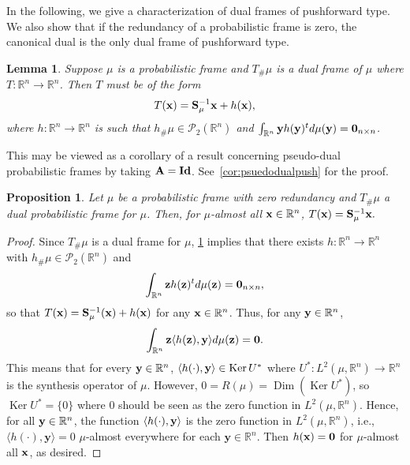 \documentclass{amsart}
\numberwithin{equation}{section}
\newcommand\R{{\mathbb R}}
\DeclareMathOperator{\kernel}{Ker}
\DeclareMathOperator{\Dim}{Dim}
\theoremstyle{plain}
\newtheorem{proposition}[theorem]{Proposition}
\newtheorem{lemma}[theorem]{Lemma}
\theoremstyle{remark}
\theoremstyle{definition}
\begin{document}
In the following, we give a characterization of dual frames of pushforward type. We also show that if the redundancy of a probabilistic frame is zero, the canonical dual is the only dual frame of pushforward type.

\begin{lemma}\label{dualChar}
    Suppose $\mu$ is a probabilistic frame and $T_\# \mu$ is a dual frame of $\mu$ where $T: \mathbb{R}^n \rightarrow \mathbb{R}^n$. Then $T$ must be of the form
    \begin{equation*}
        T({\bf x}) = {\bf S}_\mu^{-1}{\bf x} + h({\bf x}), 
    \end{equation*}
    where $h: \mathbb{R}^n \rightarrow \mathbb{R}^n$ is such that $h_\#\mu \in \mathcal{P}_2(\mathbb{R}^n)$ and $ \int_{\mathbb{R}^n } {\bf y} h({\bf y})^t d\mu({\bf y}) = {\bf 0}_{n \times n}$. 
\end{lemma}
This may be viewed as a corollary of a result concerning pseudo-dual probabilistic frames by taking ${\bf A =Id} $.  See~\cref{cor:psuedodualpush} for the proof.

\begin{proposition}\label{zeroRedundancy}
    Let $\mu$ be a probabilistic frame with zero redundancy and $T_\# \mu$ a dual probabilistic frame for $\mu$. Then, for $\mu$-almost all ${\bf x} \in \mathbb{R}^n$,  $T({\bf x}) = {\bf S}_\mu^{-1}{\bf x}.$
\end{proposition}
\begin{proof}
    Since $T_\# \mu$ is a dual frame for $\mu$, \cref{dualChar} implies that there exists $h: \mathbb{R}^n \rightarrow \mathbb{R}^n$ with $h_\#\mu \in \mathcal{P}_2(\mathbb{R}^n)$ and
    \begin{equation*}
        \int_{\mathbb{R}^n } {\bf z} h({\bf z})^t d\mu({\bf z}) = {\bf 0}_{n \times n},
    \end{equation*}
    so that $T({\bf x}) = {\bf S}_\mu^{-1}({\bf x}) + h({\bf x})$ for any ${\bf x} \in \R^n$.
Thus, for any ${\bf y} \in \mathbb{R}^n$, 
\begin{equation*}
        \int_{\mathbb{R}^n} {\bf z} \langle h({\bf z}), {\bf y} \rangle d\mu({\bf z}) = {\bf 0}.
\end{equation*}
This means that for every ${\bf y} \in \mathbb{R}^n$, $\langle h(\cdot), {\bf y} \rangle \in \kernel U^*$ where $U^*: L^2(\mu, \mathbb{R}^n) \rightarrow \mathbb{R}^n$ is the synthesis operator of $\mu$. However, $0=R(\mu)=\Dim(\kernel U^*)$, so $\kernel U^* = \{ 0\}$ where 0 should be seen as the zero function in $L^2(\mu, \mathbb{R}^n)$. Hence, for all  ${\bf y} \in \mathbb{R}^n$, the function $\langle h(\cdot), {\bf y} \rangle $ is the zero function in $L^2(\mu, \mathbb{R}^n)$, i.e., $\langle h(\cdot), \mathbf y \rangle = 0$ $\mu$-almost everywhere for each $\mathbf y \in \mathbb{R}^n$. Then $h({\bf x}) = \mathbf{0}$ for $\mu$-almost all $\bf x$, as desired.
\end{proof}
\end{document}
